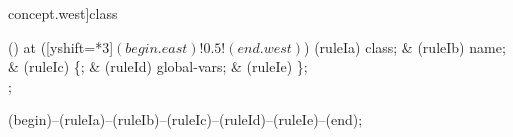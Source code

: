 \begin{syntax}[[xshift=22mm]concept.west]{class}
  
  \node[sequence,anchor=north] () at ([yshift=\syntaxrulenodeheight-0.8pt*3]$(begin.east)!0.5!(end.west)$) {
    \node[terminal]    (ruleIa) {class};
    &
    \node[terminal]    (ruleIb) {name};
    &
    \node[terminal]    (ruleIc) {\{};
    &
    \node[nonterminal] (ruleId) {global-vars};
    &
    \node[terminal]    (ruleIe) {\}};
    \\
  };
  
  \draw[path] (begin)--(ruleIa)--(ruleIb)--(ruleIc)--(ruleId)--(ruleIe)--(end);
\end{syntax}
